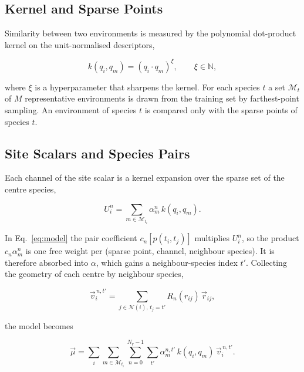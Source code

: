\documentclass[11pt,a4paper]{article}
\begin{document}
\subsection{Kernel and Sparse Points}

Similarity between two environments is measured by the polynomial
dot-product kernel on the unit-normalised descriptors,

\begin{equation}
    k(q_i, q_m) = (q_i \cdot q_m)^{\xi}, \qquad \xi \in \mathbb{N},
    \label{eq:kernel}
\end{equation}

where $\xi$ is a hyperparameter that sharpens the kernel. For each species
$t$ a set $\mathcal{M}_t$ of $M$ representative environments is drawn from
the training set by farthest-point sampling. An environment of species $t$ is compared only with the sparse
points of species $t$.

\subsection{Site Scalars and Species Pairs}

Each channel of the site scalar is a kernel expansion over the sparse set of
the centre species,

\begin{equation}
    U_i^n = \sum_{m \in \mathcal{M}_{t_i}} \alpha_m^{n}\, k(q_i, q_m).
    \label{eq:gap-site}
\end{equation}

In Eq.~\ref{eq:model} the pair coefficient $c_n[p(t_i,t_j)]$ multiplies
$U_i^n$, so the product $c_n \alpha_m^n$ is one free weight per (sparse
point, channel, neighbour species). It is therefore absorbed into $\alpha$,
which gains a neighbour-species index $t'$. Collecting the geometry of each
centre by neighbour species,

\begin{equation}
    \vec{v}_i^{\,n,t'} = \sum_{j \in \mathcal{N}(i),\, t_j = t'}
        R_n(r_{ij})\, \vec{r}_{ij},
    \label{eq:geom}
\end{equation}

the model becomes

\begin{equation}
    \vec{\mu} = \sum_i \sum_{m \in \mathcal{M}_{t_i}} \sum_{n=0}^{N_r-1}
        \sum_{t'} \alpha_m^{n,t'}\, k(q_i, q_m)\, \vec{v}_i^{\,n,t'}.
    \label{eq:gap}
\end{equation}
\end{document}
